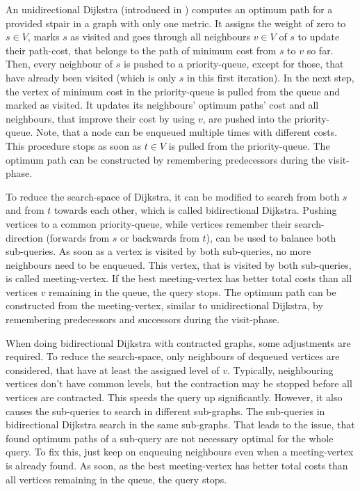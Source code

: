     An unidirectional Dijkstra (introduced in \cite{dijkstra:dijkstra}) computes an optimum path for a provided \gls{stpair} in a graph with only one metric.
    It assigns the weight of zero to $s \in V$, marks $s$ as visited and goes through all neighbours $v \in V$ of $s$ to update their path-cost, that belongs to the path of minimum cost from $s$ to $v$ so far.
    Then, every neighbour of $s$ is pushed to a priority-queue, except for those, that have already been visited (which is only $s$ in this first iteration).
    In the next step, the vertex of minimum cost in the priority-queue is pulled from the queue and marked as visited.
    It updates its neighbours' optimum paths' cost and all neighbours, that improve their cost by using $v$, are pushed into the priority-queue.
    Note, that a node can be enqueued multiple times with different costs.
    This procedure stops as soon as $t \in V$ is pulled from the priority-queue.
    The optimum path can be constructed by remembering predecessors during the visit-phase.

    To reduce the search-space of Dijkstra, it can be modified to search from both $s$ and from $t$ towards each other, which is called bidirectional Dijkstra.
    Pushing vertices to a common priority-queue, while vertices remember their search-direction (forwards from $s$ or backwards from $t$), can be used to balance both sub-queries.
    As soon as a vertex is visited by both sub-queries, no more neighbours need to be enqueued.
    This vertex, that is visited by both sub-queries, is called meeting-vertex.
    If the best meeting-vertex has better total costs than all vertices $v$ remaining in the queue, the query stops.
    The optimum path can be constructed from the meeting-vertex, similar to unidirectional Dijkstra, by remembering predecessors and successors during the visit-phase.

    When doing bidirectional Dijkstra with contracted graphs, some adjustments are required.
    To reduce the search-space, only neighbours of dequeued vertices are considered, that have at least the assigned level of $v$.
    Typically, neighbouring vertices don't have common levels, but the contraction may be stopped before all vertices are contracted.
    This speeds the query up significantly.
    However, it also causes the sub-queries to search in different sub-graphs.
    The sub-queries in bidirectional Dijkstra search in the same sub-graphs.
    That leads to the issue, that found optimum paths of a sub-query are not necessary optimal for the whole query.
    To fix this, just keep on enqueuing neighbours even when a meeting-vertex is already found.
    As soon, as the best meeting-vertex has better total costs than all vertices remaining in the queue, the query stops.

